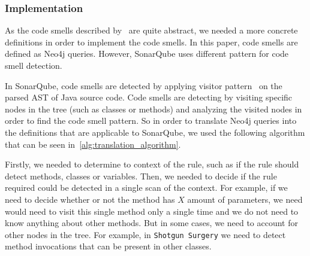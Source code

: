 
\subsubsection{Implementation}


As the code smells described by~\citeauthor{refactoring-fowler} are quite abstract, we needed
a more concrete definitions in order to implement the code smells.
In this paper, code smells are defined as Neo4j queries.
However, SonarQube uses different pattern for code smell detection.

In SonarQube, code smells are detected by applying visitor pattern~\cite{visitor_pattern} on the parsed
AST of Java source code.
Code smells are detecting by visiting specific nodes in the tree (such as classes or methods) and analyzing
the visited nodes in order to find the code smell pattern.
So in order to translate Neo4j queries into the definitions that are applicable to SonarQube, we used the following
algorithm that can be seen in~\ref{alg:translation_algorithm}.

Firstly, we needed to determine to context of the rule, such as if the rule should detect methods, classes or variables.
Then, we needed to decide if the rule required could be detected in a single scan of the context.
For example, if we need to decide whether or not the method has $X$ amount of parameters, we need would need to visit
this single method only a single time and we do not need to know anything about other methods.
But in some cases, we need to account for other nodes in the tree.
For example, in \verb|Shotgun Surgery| we need to detect method invocations that can be present in other classes.

